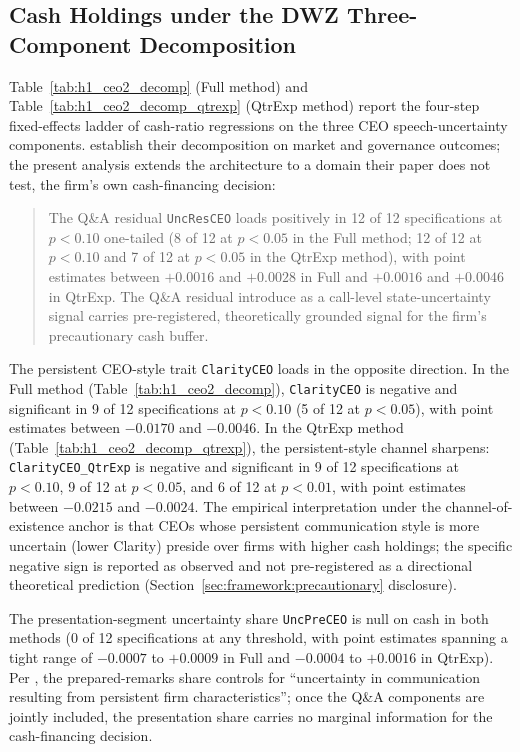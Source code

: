 \subsection{Cash Holdings under the DWZ Three-Component Decomposition}
\label{sec:main:hc}

Table~\ref{tab:h1_ceo2_decomp} (Full method) and Table~\ref{tab:h1_ceo2_decomp_qtrexp} (QtrExp method) report the four-step fixed-effects ladder of cash-ratio regressions on the three CEO speech-uncertainty components. \citeauthor{dzielinski2021} establish their decomposition on market and governance outcomes; the present analysis extends the architecture to a domain their paper does not test, the firm's own cash-financing decision:

\begin{quote}
The Q\&A residual \texttt{UncResCEO} loads positively in 12 of 12 specifications at $p<0.10$ one-tailed (8 of 12 at $p<0.05$ in the Full method; 12 of 12 at $p<0.10$ and 7 of 12 at $p<0.05$ in the QtrExp method), with point estimates between $+0.0016$ and $+0.0028$ in Full and $+0.0016$ and $+0.0046$ in QtrExp. The Q\&A residual \citeauthor{dzielinski2021} introduce as a call-level state-uncertainty signal carries pre-registered, theoretically grounded signal for the firm's precautionary cash buffer.
\end{quote}

The persistent CEO-style trait \texttt{ClarityCEO} loads in the opposite direction. In the Full method (Table~\ref{tab:h1_ceo2_decomp}), \texttt{ClarityCEO} is negative and significant in 9 of 12 specifications at $p<0.10$ (5 of 12 at $p<0.05$), with point estimates between $-0.0170$ and $-0.0046$. In the QtrExp method (Table~\ref{tab:h1_ceo2_decomp_qtrexp}), the persistent-style channel sharpens: \texttt{ClarityCEO\_QtrExp} is negative and significant in 9 of 12 specifications at $p<0.10$, 9 of 12 at $p<0.05$, and 6 of 12 at $p<0.01$, with point estimates between $-0.0215$ and $-0.0024$. The empirical interpretation under the \citeauthor{bertrand2003} channel-of-existence anchor is that CEOs whose persistent communication style is more uncertain (lower Clarity) preside over firms with higher cash holdings; the specific negative sign is reported as observed and not pre-registered as a directional theoretical prediction (Section~\ref{sec:framework:precautionary} disclosure).

The presentation-segment uncertainty share \texttt{UncPreCEO} is null on cash in both methods (0 of 12 specifications at any threshold, with point estimates spanning a tight range of $-0.0007$ to $+0.0009$ in Full and $-0.0004$ to $+0.0016$ in QtrExp). Per \citeauthor{dzielinski2021}, the prepared-remarks share controls for ``uncertainty in communication resulting from persistent firm characteristics''; once the Q\&A components are jointly included, the presentation share carries no marginal information for the cash-financing decision.

